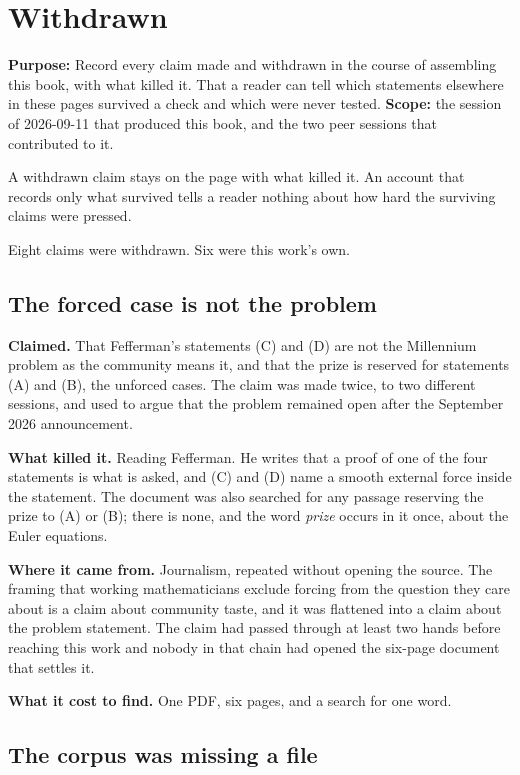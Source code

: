 \chapter{Withdrawn}

\textbf{Purpose:} Record every claim made and withdrawn in the course of assembling this book,
with what killed it. That a reader can tell which statements elsewhere in these pages survived a
check and which were never tested. \textbf{Scope:} the session of 2026-09-11 that produced this
book, and the two peer sessions that contributed to it.

A withdrawn claim stays on the page with what killed it. An account that records only what survived
tells a reader nothing about how hard the surviving claims were pressed.

Eight claims were withdrawn. Six were this work's own.

\section{The forced case is not the problem}

\textbf{Claimed.} That Fefferman's statements (C) and (D) are not the Millennium problem as the
community means it, and that the prize is reserved for statements (A) and (B), the unforced cases.
The claim was made twice, to two different sessions, and used to argue that the problem remained
open after the September 2026 announcement.

\textbf{What killed it.} Reading Fefferman. He writes that a proof of one of the four statements is
what is asked, and (C) and (D) name a smooth external force inside the statement. The document was
also searched for any passage reserving the prize to (A) or (B); there is none, and the word
\emph{prize} occurs in it once, about the Euler equations.

\textbf{Where it came from.} Journalism, repeated without opening the source. The framing that
working mathematicians exclude forcing from the question they care about is a claim about community
taste, and it was flattened into a claim about the problem statement. The claim had passed through
at least two hands before reaching this work and nobody in that chain had opened the six-page
document that settles it.

\textbf{What it cost to find.} One PDF, six pages, and a search for one word.

\section{The corpus was missing a file}

